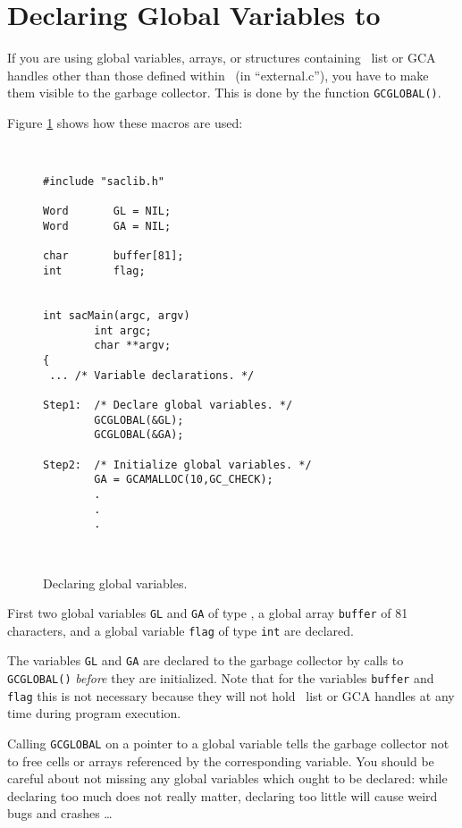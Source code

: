 \section{Declaring Global Variables to \saclib}
\label{c:CFC s:GV}

If you are using global variables, arrays, or structures containing
\saclib\ list or GCA handles other than those defined within \saclib\ (in
``external.c''), you have to make them visible to the garbage collector.
This is done by the function {\tt GCGLOBAL()}.

Figure \ref{f:GV} shows how these macros are used:

\begin{figure}[htb]
\ \hrulefill\ \small
\begin{verbatim}
#include "saclib.h"

Word       GL = NIL;
Word       GA = NIL;

char       buffer[81];
int        flag;


int sacMain(argc, argv)
        int argc;
        char **argv;
{
 ... /* Variable declarations. */

Step1:  /* Declare global variables. */
        GCGLOBAL(&GL);
        GCGLOBAL(&GA);

Step2:  /* Initialize global variables. */
        GA = GCAMALLOC(10,GC_CHECK);
        .
        .
        .

\end{verbatim}
\ \hrulefill\ \normalsize
\caption{Declaring global variables.}
\label{f:GV}
\end{figure}

First two global variables {\tt GL} and {\tt GA} of type \Word, a global
array {\tt buffer} of 81 characters, and a global variable {\tt flag} of
type {\tt int} are declared.

The variables {\tt GL} and {\tt GA} are declared to the garbage collector
by calls to {\tt GCGLOBAL()} {\em before} they are initialized. Note that
for the variables {\tt buffer} and {\tt flag} this is not necessary because
they will not hold \saclib\ list or GCA handles at any time during program
execution.

Calling {\tt GCGLOBAL} on a pointer to a global variable tells the garbage
collector not to free cells or arrays referenced by the corresponding
variable. You should be careful about not missing any global variables which
ought to be declared: while declaring too much does not really matter,
declaring too little will cause weird bugs and crashes \ldots


